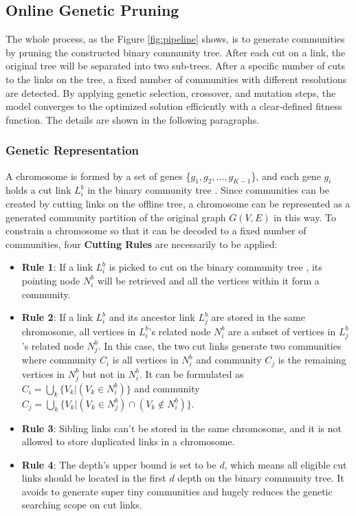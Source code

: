 \subsection{Online Genetic Pruning}

The whole process, as the Figure \ref{fig:pipeline} shows, is to generate communities by pruning the constructed binary community tree. After each cut on a link, the original tree  will be separated into two sub-trees. After a specific number of cuts to the links on the tree, a fixed number of communities with different resolutions are detected.  By applying genetic selection, crossover, and mutation steps, the model converges to the optimized solution efficiently with a clear-defined fitness function. The details are shown in the following paragraphs.

\subsubsection{Genetic Representation} 

A chromosome is formed by a set of genes \{$g_{1},g_{2},...,g_{K-1}$\}, and each gene $g_{i}$ holds a cut link $L_{i}^{b}$ in the binary community tree . Since communities can be created by cutting links on the offline tree, a chromosome can be represented as a generated community partition of the original graph $G(V,E)$ in this way. 
To constrain a chromosome so that it can be decoded to a fixed number of communities, four \textbf{Cutting Rules} are necessarily to be applied: 
\begin{itemize} %
	\item \textbf{ Rule 1}: If a link $L_{i}^{b}$ is picked to cut on the binary community tree , its pointing node $N_{i}^{b}$ will be retrieved and all the vertices within it form a community. 
	\item \textbf{ Rule 2}: If a link {$L_{i}^{b}$} and its ancestor link {$L_{j}^{b}$} are stored in the same chromosome, all vertices in {$L_{i}^{b}$}'s related node {$N_{i}^{b}$} are a subset of vertices in {$L_{j}^{b}$}'s related node {$N_{j}^{b}$}. In this case, the two cut links generate two communities where community $C_{i}$ is all vertices in $ N_{i}^{b}$ and community $C_{j}$ is the remaining vertices in $ N_{j}^{b}$ but not in $ N_{i}^{b}$. It can be formulated as   $C_{i} = \bigcup_{k}\{V_{k}|(V_{k}\in N_{i}^{b})\}$ and community $C_{j} = \bigcup_{k}\{V_{k}|(V_{k}\in N_{j}^{b}) \cap (V_{k}\notin N_{i}^{b})\}$.  
	\item \textbf{ Rule 3}: Sibling links can't be stored in the same chromosome, and it is not allowed to store duplicated links in a chromosome.
	\item \textbf{ Rule 4}: The depth's upper bound is set to be $d$, which means all eligible cut links should be located in the first $d$ depth on the binary community tree. It avoids to generate super tiny communities and hugely reduces the genetic searching scope on cut links.
\end{itemize} 

